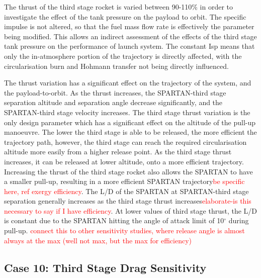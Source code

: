 The thrust of the third stage rocket is varied between 90-110\% in order to investigate the effect of the tank pressure on the payload to orbit. The specific impulse is not altered, so that the fuel mass flow rate is effectively the parameter being modified. This allows an indirect assessment of the effects of the third stage tank pressure on the performance of launch system. The constant Isp means that only the in-atmosphere portion of the trajectory is directly affected, with the circularisation burn and Hohmann transfer not being directly influenced. 

The thrust variation has a significant effect on the trajectory of the system, and the payload-to-orbit. As the thrust increases, the SPARTAN-third stage separation altitude and separation angle decrease significantly, and the SPARTAN-third stage velocity increases. 
The third stage thrust variation is the only design parameter which has a significant effect on the altitude of the pull-up manoeuvre. The lower the third stage is able to be released, the more efficient the trajectory path, however, the third stage can reach the required circularisation altitude more easily from a higher release point. As the third stage thrust increases, it can be released at lower altitude, onto a more efficient trajectory. 
Increasing the thrust of the third stage rocket also allows the SPARTAN to have a smaller pull-up, resulting in a more efficient SPARTAN trajectory\textcolor{red}{be specific here, ref exergy efficiency}. The L/D of the SPARTAN at SPARTAN-third stage separation generally increases as the third stage thrust increases\textcolor{red}{elaborate-is this necessary to say if I have efficiency}. At lower values of third stage thrust, the L/D is constant due to the SPARTAN hitting the angle of attack limit of 10$^\circ$ during pull-up. 
\textcolor{red}{connect this to other sensitivity studies, where release angle is almost always at the max (well not max, but the max for efficiency)}


\subsection{Case 10: Third Stage Drag Sensitivity}


